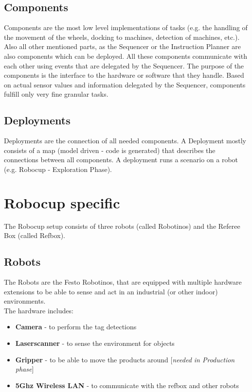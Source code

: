 \subsection{Components}
Components are the most low level implementations of tasks (e.g. the handling of the movement of the wheels, docking to machines, detection of machines, etc.).
Also all other mentioned parts, as the Sequencer or the Instruction Planner are also components which can be deployed.
All these components communicate with each other using events that are delegated by the Sequencer.
The purpose of the components is the interface to the hardware or software that they handle.
Based on actual sensor values and information delegated by the Sequencer, components fulfill only very fine granular tasks.

\subsection{Deployments}
\label{subsec:Deployments}
Deployments are the connection of all needed components.
A Deployment mostly consists of a map (model driven - code is generated) that describes the connections between all components. 
A deployment runs a scenario on a robot (e.g. Robocup - Exploration Phase).

\section{Robocup specific}
The Robocup setup consists of three robots (called Robotinos) and the Referee Box (called Refbox).

\subsection{Robots}
The Robots are the Festo Robotinos, that are equipped with multiple hardware extensions to be able to sense and act
in an industrial (or other indoor) environments.\\
The hardware includes:
\begin{itemize}
    \item \textbf{Camera} - to perform the tag detections
    \item \textbf{Laserscanner} - to sense the environment for objects
    \item \textbf{Gripper} - to be able to move the products around [\textit{needed in Production phase}]
    \item \textbf{5Ghz Wireless LAN} - to communicate with the refbox and other robots
\end{itemize}

